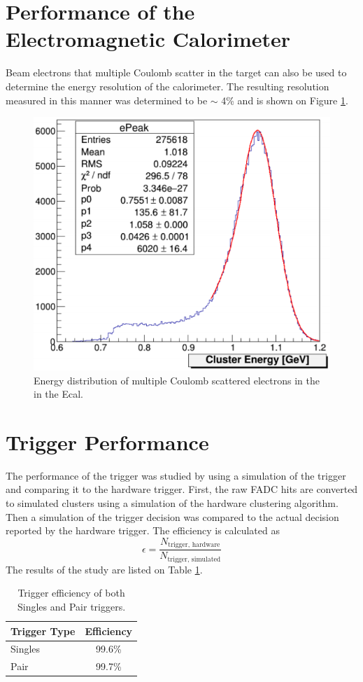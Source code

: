 \section{Performance of the Electromagnetic Calorimeter}

Beam electrons that multiple Coulomb scatter in the target can also be used to 
determine the energy resolution of the calorimeter.  The resulting resolution 
measured in this manner was determined to be $\sim$ 4\% and is shown on Figure
\ref{fig:energy_res}.
\begin{figure}[h!t]
    \centering
    \includegraphics[width=.7\textwidth]{images/ecal_energy_resolution.png}
    \caption{Energy distribution of multiple Coulomb scattered electrons in the
             in the Ecal.}
    \label{fig:energy_res}
\end{figure} 

\section{Trigger Performance}

The performance of the trigger was studied by using a simulation of the trigger
and comparing it to the hardware trigger.  First, the raw FADC hits are converted
to simulated clusters using a simulation of the hardware clustering algorithm. Then
a simulation of the trigger decision was compared to the actual decision reported
by the hardware trigger.  The efficiency is calculated as 
\begin{equation}
\epsilon = \frac{N_{\text{trigger, hardware}}}{N_{\text{trigger, simulated}}}
\end{equation}
The results of the study are listed on Table 
\ref{tab:trig_eff}.
\begin{table}[h!]
    \centering
    \begin{tabular}{lc}
        \toprule
        \textbf{Trigger Type} & \textbf{Efficiency} \\
        \midrule
        \midrule
        Singles               & 99.6\%              \\
        Pair                  & 99.7\%              \\
        \bottomrule
    \end{tabular}
    \caption{Trigger efficiency of both Singles and Pair triggers.}
    \label{tab:trig_eff}
\end{table}



